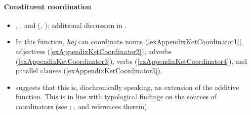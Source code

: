 \paragraph{Constituent coordination}\label{appendixKetCoordination}
\begin{itemize}
	\item \textcite[311]{Georg2007}, \textcite[96–100, 108]{Nefedov2015}, \textcite[85]{Vajda2004} and \citeauthor{Werner1997} (\citeyear[318–323]{Werner1997}, \citeyear[292]{Werner2002}); additional discussion in \textcite[306]{vanBaar1997}.
	\item In this function, \textit{hāj} can coordinate nouns (\ref{exAppendixKetCoordinator1}), adjectives  (\ref{exAppendixKetCoordinator2}), adverbs (\ref{exAppendixKetCoordinator3}), verbs (\ref{exAppendixKetCoordinator4}), and parallel clauses (\ref{exAppendixKetCoordinator5}).
	\item \textcite[96]{Nefedov2015} suggests that this is, diachronically speaking, an extension of the additive function. This is in line with typological findings on the sources of coordinators (see \cite{Forker2016}; \cite[58–59]{KutevaEtAl2019}, and references therein).
\end{itemize}

